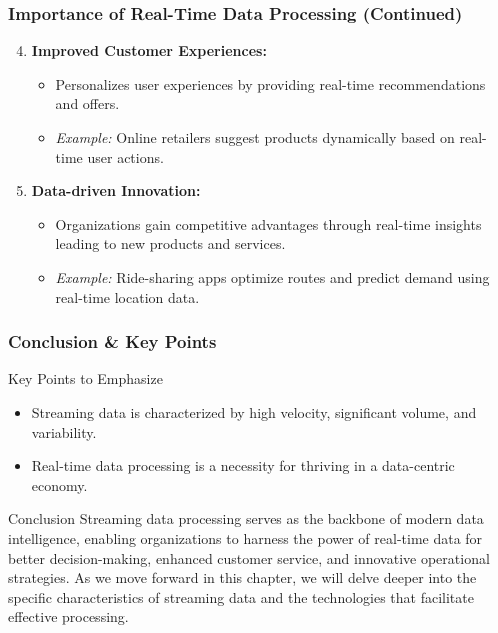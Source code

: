 \documentclass[aspectratio=169]{beamer}
\begin{document}
\begin{frame}[fragile]
    \frametitle{Importance of Real-Time Data Processing (Continued)}
    \begin{enumerate}
        \setcounter{enumi}{3}
        \item \textbf{Improved Customer Experiences:}
        \begin{itemize}
            \item Personalizes user experiences by providing real-time recommendations and offers.
            \item \textit{Example:} Online retailers suggest products dynamically based on real-time user actions.
        \end{itemize}
        
        \item \textbf{Data-driven Innovation:}
        \begin{itemize}
            \item Organizations gain competitive advantages through real-time insights leading to new products and services.
            \item \textit{Example:} Ride-sharing apps optimize routes and predict demand using real-time location data.
        \end{itemize}
    \end{enumerate}
\end{frame}

\begin{frame}[fragile]
    \frametitle{Conclusion & Key Points}
    \begin{block}{Key Points to Emphasize}
        \begin{itemize}
            \item Streaming data is characterized by high velocity, significant volume, and variability.
            \item Real-time data processing is a necessity for thriving in a data-centric economy.
        \end{itemize}
    \end{block}
    \begin{block}{Conclusion}
        Streaming data processing serves as the backbone of modern data intelligence, enabling organizations to harness the power of real-time data for better decision-making, enhanced customer service, and innovative operational strategies.
        As we move forward in this chapter, we will delve deeper into the specific characteristics of streaming data and the technologies that facilitate effective processing.
    \end{block}
\end{frame}
\end{document}
